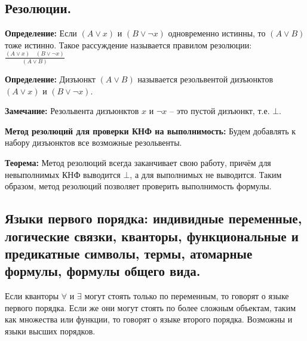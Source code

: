 \subsection{Резолюции.}
\textbf{Определение:} Если $(A \lor x)$ и $(B \lor \neg x)$ одновременно истинны, то $(A \lor B)$ тоже истинно. Такое рассуждение называется правилом резолюции: $\frac{(A \lor x) \quad (B \lor \neg x)}{(A \lor B)}$

\textbf{Определение:} Дизъюнкт $(A \lor B)$ называется резольвентой дизъюнктов $(A \lor x)$ и $(B \lor \neg x)$.

\textbf{Замечание:} Резольвента дизъюнктов $x$ и $\neg x$ -- это пустой дизъюнкт, т.е. $\bot$.

\textbf{Метод резолюций для проверки КНФ на выполнимость:} Будем добавлять к набору дизъюнктов все возможные резольвенты.

\textbf{Теорема:} Метод резолюций всегда заканчивает свою работу, причём для невыполнимых КНФ выводится $\bot$, а для выполнимых не выводится. Таким образом, метод резолюций позволяет проверить выполнимость формулы.

\subsection{Языки первого порядка: индивидные переменные, логические связки, кванторы, функциональные и предикатные символы, термы, атомарные формулы, формулы общего вида.}

Если кванторы $\forall$ и $\exists$ могут стоять только по переменным, то говорят о языке первого порядка. Если же они могут стоять по более сложным объектам, таким как множества или функции, то говорят о языке второго порядка. Возможны и языки высших порядков.

